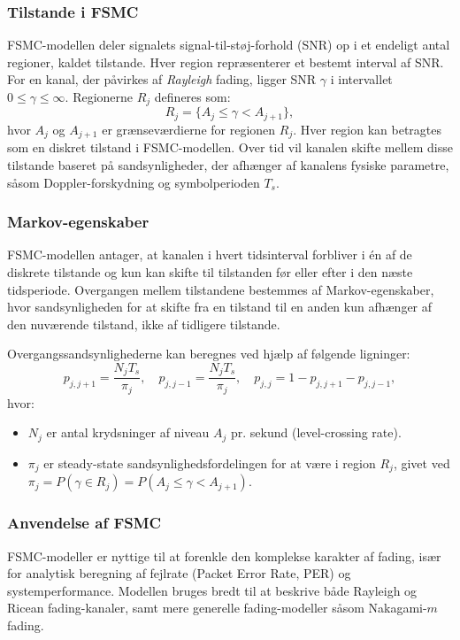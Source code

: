 \documentclass[a4paper,12pt]{book}
\begin{document}
	\subsubsection{Tilstande i FSMC}
	FSMC-modellen deler signalets signal-til-støj-forhold (SNR) op i et endeligt antal regioner, kaldet tilstande. Hver region repræsenterer et bestemt interval af SNR. For en kanal, der påvirkes af \textit{Rayleigh} fading, ligger SNR \( \gamma \) i intervallet \( 0 \leq \gamma \leq \infty \). Regionerne \( R_j \) defineres som:
	\[
	R_j = \{ A_j \leq \gamma < A_{j+1} \},
	\]
	hvor \( A_j \) og \( A_{j+1} \) er grænseværdierne for regionen \(R_j\). Hver region kan betragtes som en diskret tilstand i FSMC-modellen. Over tid vil kanalen skifte mellem disse tilstande baseret på sandsynligheder, der afhænger af kanalens fysiske parametre, såsom Doppler-forskydning og symbolperioden \( T_s \).
	
	\subsubsection{Markov-egenskaber}
	FSMC-modellen antager, at kanalen i hvert tidsinterval forbliver i én af de diskrete tilstande og kun kan skifte til tilstanden før eller efter i den næste tidsperiode. Overgangen mellem tilstandene bestemmes af Markov-egenskaber, hvor sandsynligheden for at skifte fra en tilstand til en anden kun afhænger af den nuværende tilstand, ikke af tidligere tilstande.
	
	Overgangssandsynlighederne kan beregnes ved hjælp af følgende ligninger:
	\[
	p_{j,j+1} = \frac{N_j T_s}{\pi_j}, \quad p_{j,j-1} = \frac{N_j T_s}{\pi_j}, \quad p_{j,j} = 1 - p_{j,j+1} - p_{j,j-1},
	\]
	hvor:
	\begin{itemize}
		\item \( N_j \) er antal krydsninger af niveau \( A_j \) pr. sekund (level-crossing rate).
		\item \( \pi_j \) er steady-state sandsynlighedsfordelingen for at være i region \( R_j \), givet ved \( \pi_j = P(\gamma \in R_j) = P(A_j \leq \gamma < A_{j+1}) \).
	\end{itemize}
	
	\subsubsection{Anvendelse af FSMC}
	FSMC-modeller er nyttige til at forenkle den komplekse karakter af fading, især for analytisk beregning af fejlrate (Packet Error Rate, PER) og systemperformance. Modellen bruges bredt til at beskrive både Rayleigh og Ricean fading-kanaler, samt mere generelle fading-modeller såsom Nakagami-\(m\) fading.
	
\end{document}
